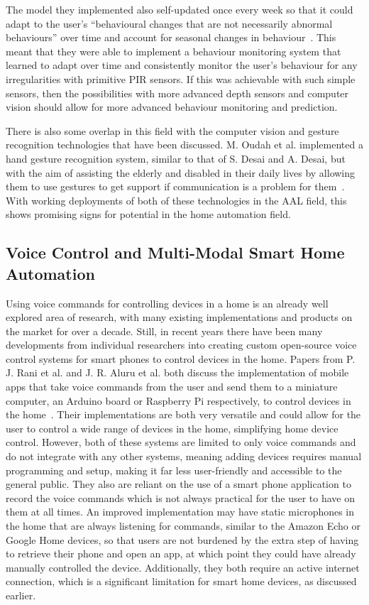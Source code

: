 The model they implemented also self-updated once every week so that it could adapt to the user's ``behavioural changes that are not necessarily abnormal behaviours'' over time and account for seasonal changes in behaviour~\cite{Eisa17}.
This meant that they were able to implement a behaviour monitoring system that learned to adapt over time and consistently monitor the user's behaviour for any irregularities with primitive PIR sensors.
If this was achievable with such simple sensors, then the possibilities with more advanced depth sensors and computer vision should allow for more advanced behaviour monitoring and prediction.

There is also some overlap in this field with the computer vision and gesture recognition technologies that have been discussed.
M. Oudah et al. implemented a hand gesture recognition system, similar to that of S. Desai and A. Desai, but with the aim of assisting the elderly and disabled in their daily lives by allowing them to use gestures to get support if communication is a problem for them~\cite{Ouda21}.
With working deployments of both of these technologies in the AAL field, this shows promising signs for potential in the home automation field.

\subsection{Voice Control and Multi-Modal Smart Home Automation}
Using voice commands for controlling devices in a home is an already well explored area of research, with many existing implementations and products on the market for over a decade.
Still, in recent years there have been many developments from individual researchers into creating custom open-source voice control systems for smart phones to control devices in the home.
Papers from P. J. Rani et al. and J. R. Aluru et al. both discuss the implementation of mobile apps that take voice commands from the user and send them to a miniature computer, an Arduino board or Raspberry Pi respectively, to control devices in the home~\cite{Alur21,Rani17}.
Their implementations are both very versatile and could allow for the user to control a wide range of devices in the home, simplifying home device control.
However, both of these systems are limited to only voice commands and do not integrate with any other systems, meaning adding devices requires manual programming and setup, making it far less user-friendly and accessible to the general public.
They also are reliant on the use of a smart phone application to record the voice commands which is not always practical for the user to have on them at all times.
An improved implementation may have static microphones in the home that are always listening for commands, similar to the Amazon Echo or Google Home devices, so that users are not burdened by the extra step of having to retrieve their phone and open an app, at which point they could have already manually controlled the device.
Additionally, they both require an active internet connection, which is a significant limitation for smart home devices, as discussed earlier.

